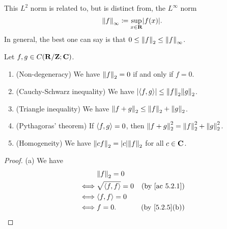 \begin{note}
  This \(L^2\) norm is related to, but is distinct from, the \(L^\infty\) norm
  \[
    \norm*{f}_\infty \coloneqq \sup_{x \in \R} \abs{f(x)}.
  \]
  In general, the best one can say is that \(0 \leq \norm*{f}_2 \leq \norm*{f}_\infty\).
\end{note}

\setcounter{theorem}{6}
\begin{lemma}\label{5.2.7}
  Let \(f, g \in C(\R / \Z ; \C)\).
  \begin{enumerate}
    \item (Non-degeneracy)
          We have \(\norm*{f}_2 = 0\) if and only if \(f = 0\).
    \item (Cauchy-Schwarz inequality)
          We have \(\abs{\inner*{f, g}} \leq \norm*{f}_2 \norm*{g}_2\).
    \item (Triangle inequality)
          We have \(\norm*{f + g}_2 \leq \norm*{f}_2 + \norm*{g}_2\).
    \item (Pythagoras' theorem)
          If \(\inner*{f, g} = 0\), then \(\norm*{f + g}_2^2 = \norm*{f}_2^2 + \norm*{g}_2^2\).
    \item (Homogeneity)
          We have \(\norm*{cf}_2 = \abs{c} \norm*{f}_2\) for all \(c \in \C\).
  \end{enumerate}
\end{lemma}

\begin{proof}{(a)}
  We have
  \begin{align*}
         & \norm*{f}_2 = 0                                        \\
    \iff & \sqrt{\inner*{f, f}} = 0 & \text{(by \cref{ac 5.2.1})} \\
    \iff & \inner*{f, f} = 0                                      \\
    \iff & f = 0.                   & \text{(by \cref{5.2.5}(b))}
  \end{align*}
\end{proof}


